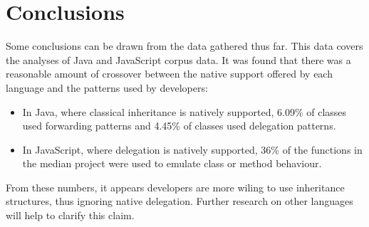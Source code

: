 \chapter{Conclusions}\label{C:con}
Some conclusions can be drawn from the data gathered thus far. This data covers the analyses of Java and JavaScript corpus data. It was found that there was a reasonable amount of crossover between the native support offered by each language and the patterns used by developers:
\begin{itemize}
	\item In Java, where classical inheritance is natively supported, 6.09\% of classes used forwarding patterns and 4.45\% of classes used delegation patterns.
	\item In JavaScript, where delegation is natively supported, 36\% of the functions in the median project were used to emulate class or method behaviour.
\end{itemize}
From these numbers, it appears developers are more wiling to use inheritance structures,  thus ignoring native delegation. Further research on other languages will help to clarify this claim.
